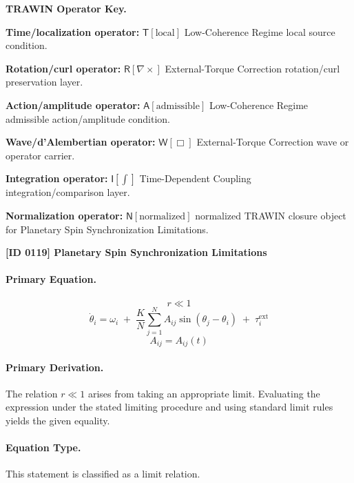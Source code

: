 \par\vspace{0.45\baselineskip}
\noindent\begin{minipage}[t]{\linewidth}
\begingroup
\small
\raggedright
\textbf{TRAWIN Operator Key.}\par
\noindent\textbf{Time/localization operator:} $\mathsf{T}\!\left[\mathrm{local}\right]$ Low-Coherence Regime local source condition.\par
\noindent\textbf{Rotation/curl operator:} $\mathsf{R}\!\left[\nabla\times\right]$ External-Torque Correction rotation/curl preservation layer.\par
\noindent\textbf{Action/amplitude operator:} $\mathsf{A}\!\left[\mathrm{admissible}\right]$ Low-Coherence Regime admissible action/amplitude condition.\par
\noindent\textbf{Wave/d'Alembertian operator:} $\mathsf{W}\!\left[\Box\right]$ External-Torque Correction wave or operator carrier.\par
\noindent\textbf{Integration operator:} $\mathsf{I}\!\left[\int\right]$ Time-Dependent Coupling integration/comparison layer.\par
\noindent\textbf{Normalization operator:} $\mathsf{N}\!\left[\mathrm{normalized}\right]$ normalized TRAWIN closure object for Planetary Spin Synchronization Limitations.\par
\endgroup
\end{minipage}

\clearpage
\noindent\textbf{[ID 0119] Planetary Spin Synchronization Limitations}\par
\vspace{0.35em}
\paragraph{Primary Equation.}
\[
r \ll 1
\]
\[
\dot{\theta}_i
=
\omega_i
\;+\;
\frac{K}{N}\sum_{j=1}^{N}A_{ij}\sin(\theta_j-\theta_i)
\;+\;
\tau_i^{\mathrm{ext}}
\]
\[
A_{ij}=A_{ij}(t)
\]

\paragraph{Primary Derivation.}
The relation \( r \ll 1 \) arises from taking an appropriate limit. Evaluating the expression under the stated limiting procedure and using standard limit rules yields the given equality.
\paragraph{Equation Type.}
This statement is classified as a limit relation.

